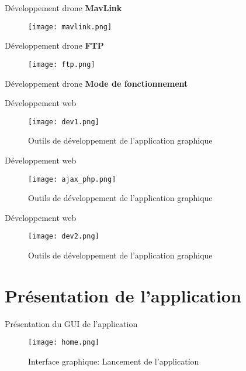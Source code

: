 \documentclass[french]{beamer}
\begin{document}
\begin{frame}{Développement drone}
\textbf{MavLink}
\\
\begin{figure}
 \texttt{[image: mavlink.png]}
\end{figure}
\end{frame}


\begin{frame}{Développement drone}
\textbf{FTP}
\\
\begin{figure}
 \texttt{[image: ftp.png]}
\end{figure}
\end{frame}


\begin{frame}{Développement drone}
\textbf{Mode de fonctionnement}
\end{frame}


\begin{frame}{Développement web}
\begin{figure}
 \texttt{[image: dev1.png]}
 \caption{Outils de développement de l'application graphique}
 \end{figure}
\end{frame}
\begin{frame}{Développement web}
\begin{figure}
 \texttt{[image: ajax\_php.png]}
 \caption{Outils de développement de l'application graphique}
 \end{figure}
\end{frame}

\begin{frame}{Développement web}
\begin{figure}
 \texttt{[image: dev2.png]}
 \caption{Outils de développement de l'application graphique}
 \end{figure}
\end{frame}


\section{Présentation de l’application}

\begin{frame}[fragile]{Présentation du GUI de l’application}
\begin{figure}
 \texttt{[image: home.png]}
\caption{Interface graphique: Lancement de l'application}
\end{figure}
\end{frame}
\end{document}
